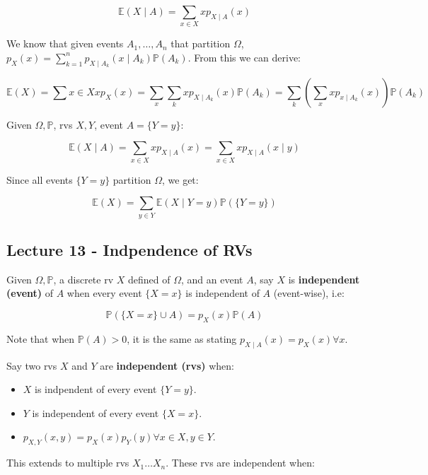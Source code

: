 \documentclass{article}
\begin{document}
\begin{equation}
  \tag{Conditional Expectation}
  \boxed{
    \mathbb{E}(X \mid A) = \sum_{x\in X} xp_{X\mid A}(x)
  }
\end{equation}

We know that given events $A_1, \dots, A_n$ that partition $\Omega$,
$p_X(x) = \sum_{k=1}^n p_{X\mid A_k} (x\mid A_k)
\mathbb{P}(A_k)$. From this we can derive:

\[
  \mathbb{E}(X) = \sum{x\in X} xp_X(x) = \sum_x \sum_k xp_{X\mid A_k}
  (x) \mathbb{P}(A_k) = \sum_k(\sum_x xp_{x\mid A_k}(x))
  \mathbb{P}(A_k)
\]

Given $\Omega, \mathbb{P}$, rvs $X,Y$, event $A = \{Y=y\}$:

\[
  \mathbb{E}(X\mid A) = \sum_{x\in X} xp_{X\mid A}(x) = \sum_{x\in X}
  xp_{X\mid A}(x \mid y)
\]

Since all events $\{Y = y\}$ partition $\Omega$, we get:

\[
  \mathbb{E}(X) = \sum_{y\in Y} \mathbb{E}(X \mid Y=y)
  \mathbb{P}(\{Y=y\})
\]


\medskip\hline
\subsection{Lecture 13 - Indpendence of RVs}

Given $\Omega, \mathbb{P}$, a discrete rv $X$ defined of $\Omega$, and
an event $A$, say $X$ is \textbf{independent (event)} of $A$ when
every event $\{X=x\}$ is independent of $A$ (event-wise), i.e:

\begin{equation}
  \tag{RV Event Independence}
  \boxed{
    \mathbb{P}(\{X=x\} \cup A) = p_X(x) \mathbb{P}(A)
  }
\end{equation}

Note that when $\mathbb{P}(A) > 0$, it is the same as stating
$p_{X\mid A} (x) = p_X(x) \forall x$.

Say two rvs $X$ and $Y$ are \textbf{independent (rvs)} when:

\begin{itemize}
\item $X$ is indpendent of every event $\{Y=y\}$.
\item $Y$ is independent of every event $\{X=x\}$.
\item $p_{X,Y}(x,y) = p_X(x) p_Y(y) \forall x\in X, y\in Y$.
\end{itemize}

This extends to multiple rvs $X_1\dots X_n$. These rvs are independent
when:
\end{document}
